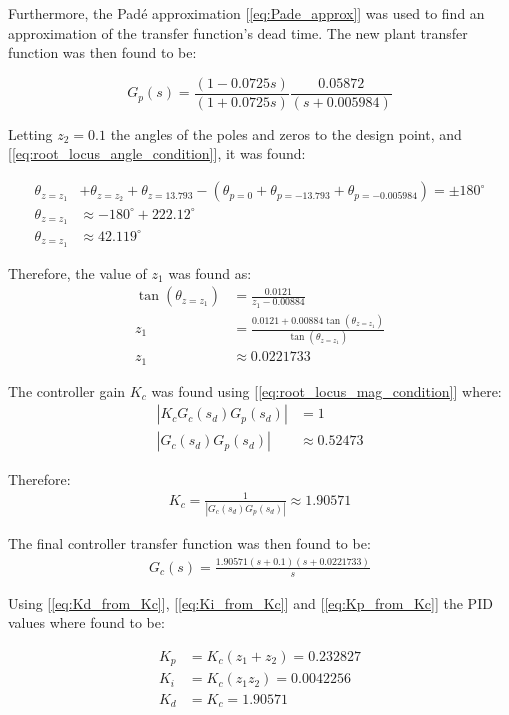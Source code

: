 Furthermore, the Pad\'e approximation [\ref{eq:Pade_approx}] was used to find an approximation of the transfer function's dead time. The new plant transfer function was then found to be:

\begin{equation*}
    G_p(s) = \frac{(1-0.0725s)}{(1+0.0725s)} \frac{0.05872}{(s+0.005984)}
\end{equation*}

Letting $z_2 = 0.1$ the angles of the poles and zeros to the design point, and [\ref{eq:root_locus_angle_condition}], it was found:

\begin{align*}
    \theta_{z=z_1} &+ \theta_{z=z_2} + \theta_{z=13.793} - (\theta_{p=0} + \theta_{p=-13.793} + \theta_{p=-0.005984}) = \pm 180^\circ\\
    \theta_{z=z_1} &\approx -180^\circ + 222.12^\circ \\
    \theta_{z=z_1} &\approx 42.119^\circ
\end{align*}

Therefore, the value of $z_1$ was found as:
\begin{align*}
    \tan(\theta_{z=z_1}) &= \frac{0.0121}{z_1 - 0.00884} \\
    z_1 &= \frac{0.0121 + 0.00884 \tan(\theta_{z=z_1})}{\tan(\theta_{z=z_1})} \\
    z_1 &\approx 0.0221733
\end{align*}

The controller gain $K_c$ was found using [\ref{eq:root_locus_mag_condition}] where:
\begin{align*}
    |K_c G_c(s_d)G_p(s_d)| &= 1\\
    |G_c(s_d)G_p(s_d)| &\approx 0.52473
\end{align*}

Therefore:
\begin{align*}
    K_c = \frac{1}{|G_c(s_d)G_p(s_d)|} \approx 1.90571
\end{align*}

The final controller transfer function was then found to be:
\begin{align*}
    G_c(s) = \frac{1.90571 (s + 0.1)(s+0.0221733)}{s}
\end{align*}

Using [\ref{eq:Kd_from_Kc}], [\ref{eq:Ki_from_Kc}] and [\ref{eq:Kp_from_Kc}] the PID values where found to be:

\begin{align*}
    K_p &= K_c (z_1 + z_2) = 0.232827 \\
    K_i &= K_c (z_1 z_2) = 0.0042256 \\
    K_d &= K_c = 1.90571
\end{align*}

